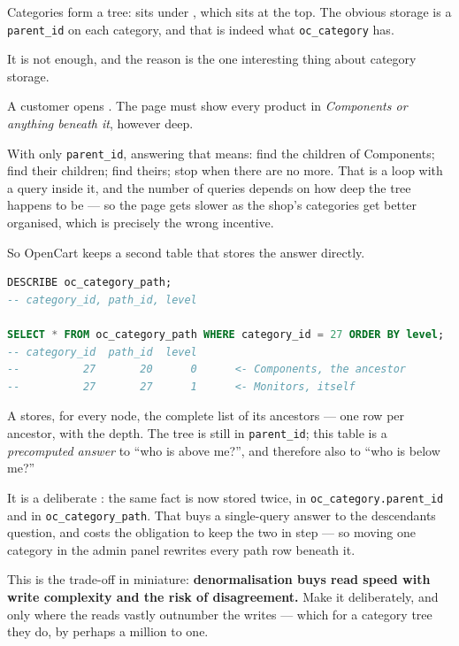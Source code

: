 Categories form a tree:  sits under
, which sits at the top. The obvious storage is a
\texttt{parent\_id} on each category, and that is indeed what
\texttt{oc\_category} has.

It is not enough, and the reason is the one interesting thing about category
storage.

\begin{alertbox}
A customer opens . The page must show every product in
\emph{Components or anything beneath it}, however deep.

\smallskip
With only \texttt{parent\_id}, answering that means: find the children of
Components; find their children; find theirs; stop when there are no more.
That is a loop with a query inside it, and the number of queries depends on how
deep the tree happens to be --- so the page gets slower as the shop's
categories get better organised, which is precisely the wrong incentive.
\end{alertbox}

So OpenCart keeps a second table that stores the answer directly.

\begin{lstlisting}[language=sql]
DESCRIBE oc_category_path;
-- category_id, path_id, level

SELECT * FROM oc_category_path WHERE category_id = 27 ORDER BY level;
-- category_id  path_id  level
--          27       20      0      <- Components, the ancestor
--          27       27      1      <- Monitors, itself
\end{lstlisting}

\begin{definitionbox}
A  stores, for every node, the complete list of its
ancestors --- one row per ancestor, with the depth. The tree is still in
\texttt{parent\_id}; this table is a \emph{precomputed answer} to ``who is
above me?'', and therefore also to ``who is below me?''

\smallskip
It is a deliberate : the same fact is now stored twice,
in \texttt{oc\_category.parent\_id} and in \texttt{oc\_category\_path}. That
buys a single-query answer to the descendants question, and costs the
obligation to keep the two in step --- so moving one category in the admin
panel rewrites every path row beneath it.

\smallskip
This is the trade-off in miniature: \textbf{denormalisation buys read speed
with write complexity and the risk of disagreement.} Make it deliberately, and
only where the reads vastly outnumber the writes --- which for a category tree
they do, by perhaps a million to one.
\end{definitionbox}

